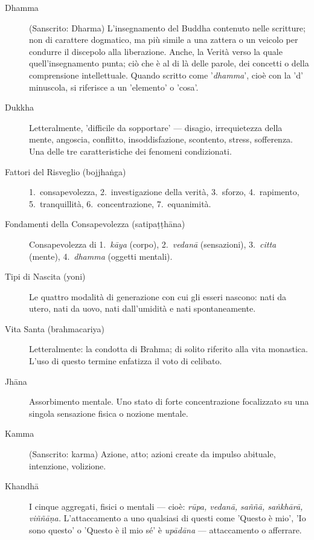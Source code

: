 \begin{description}
\item[Dhamma] (Sanscrito: Dharma) L'insegnamento del Buddha contenuto
  nelle scritture; non di carattere dogmatico, ma più simile a una zattera o
  un veicolo per condurre il discepolo alla liberazione. Anche, la Verità verso
  la quale quell'insegnamento punta; ciò che è al di là delle parole, dei concetti o
  della comprensione intellettuale. Quando scritto come '\emph{dhamma}', cioè
  con la 'd' minuscola, si riferisce a un 'elemento' o 'cosa'.

\item[Dukkha] Letteralmente, 'difficile da sopportare' --- disagio, irrequietezza
  della mente, angoscia, conflitto, insoddisfazione, scontento, stress,
  sofferenza. Una delle tre caratteristiche dei fenomeni condizionati.

\item[Fattori del Risveglio (bojjhaṅga)] 1.~consapevolezza, 2.~investigazione della verità, 3.~sforzo, 4.~rapimento, 5.~tranquillità, 6.~concentrazione, 7.~equanimità.

\item[Fondamenti della Consapevolezza (satipaṭṭhāna)] Consapevolezza di 1.~\emph{kāya} (corpo), 2.~\emph{vedanā} (sensazioni), 3.~\emph{citta} (mente),
4.~\emph{dhamma} (oggetti mentali).

\item[Tipi di Nascita (yoni)] Le quattro modalità di generazione con cui
  gli esseri nascono: nati da utero, nati da uovo, nati dall'umidità e nati spontaneamente.

\item[Vita Santa (brahmacariya)] Letteralmente: la condotta di Brahma; di solito
  riferito alla vita monastica. L'uso di questo termine enfatizza il voto di
  celibato.

\item[Jhāna] Assorbimento mentale. Uno stato di forte concentrazione focalizzato
  su una singola sensazione fisica o nozione mentale.

\item[Kamma] (Sanscrito: karma) Azione, atto; azioni create da
  impulso abituale, intenzione, volizione.

\item[Khandhā] I cinque aggregati, fisici o mentali ---
  cioè: \emph{rūpa, vedanā, saññā, saṅkhārā, viññāṇa.} L'attaccamento a
  uno qualsiasi di questi come 'Questo è mio', 'Io sono questo' o 'Questo è il mio sé' è
  \emph{upādāna} --- attaccamento o afferrare.


\end{description}
